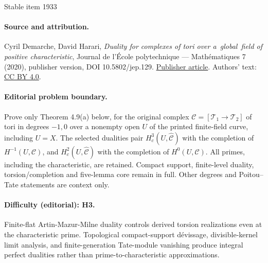 \documentclass[11pt]{article}
\begin{document}
\begin{center}{\Large Stable item 1933}\end{center}
\paragraph{Source and attribution.}
Cyril Demarche, David Harari, \emph{Duality for complexes of tori over a global field of positive characteristic}, Journal de l’École polytechnique — Mathématiques 7 (2020), publisher version, DOI 10.5802/jep.129. \href{https://jep.centre-mersenne.org/articles/10.5802/jep.129/}{Publisher article}. Authors' text: \href{https://creativecommons.org/licenses/by/4.0/}{CC BY 4.0}.
\paragraph{Editorial problem boundary.}
Prove only Theorem 4.9(a) below, for the original complex \(\mathcal C=[\mathcal T_1\to\mathcal T_2]\) of tori in degrees \(-1,0\) over a nonempty open \(U\) of the printed finite-field curve, including \(U=X\). The selected dualities pair \(H_c^3(U,\widehat{\mathcal C})\) with the completion of \(H^{-1}(U,\mathcal C)\), and \(H_c^2(U,\widehat{\mathcal C})\) with the completion of \(H^0(U,\mathcal C)\). All primes, including the characteristic, are retained. Compact support, finite-level duality, torsion/completion and five-lemma core remain in full. Other degrees and Poitou--Tate statements are context only.
\paragraph{Difficulty (editorial): H3.}
Finite-flat Artin-Mazur-Milne duality controls derived torsion realizations even at the characteristic prime. Topological compact-support dévissage, divisible-kernel limit analysis, and finite-generation Tate-module vanishing produce integral perfect dualities rather than prime-to-characteristic approximations.
\end{document}

